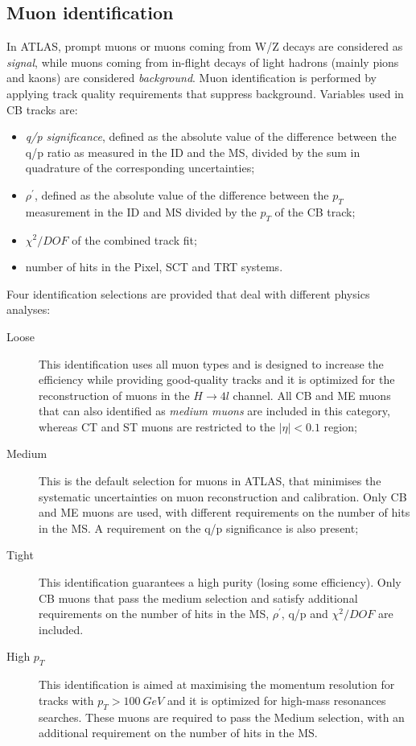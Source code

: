 \documentclass[a4paper,twoside,12pt]{book}
\begin{document}
\subsection*{Muon identification}
In ATLAS, prompt muons or muons coming from W/Z decays are considered as \textit{signal}, 
while muons coming from in-flight decays of light hadrons (mainly pions and kaons) 
are considered \textit{background}. 
Muon identification is performed by applying track quality requirements that
suppress background. Variables used in CB tracks are:
\begin{itemize}
\item \textit{q/p significance}, defined as the absolute value of the difference between the q/p
ratio as measured in the ID and the MS, divided by the sum in quadrature of the corresponding
uncertainties;
\item $\mathit{\rho^{'}}$, defined as the absolute value of the difference between the $p_{T}$
measurement in the ID and MS divided by the $p_{T}$ of the CB track;
\item $\chi^{2}/DOF$ of the combined track fit;
\item number of hits in the Pixel, SCT and TRT systems.
\end{itemize}

Four identification selections are provided that deal with different physics analyses:
\begin{description}
\item [Loose] This identification uses all muon types and is designed to increase the efficiency while providing
good-quality tracks and it is optimized for the reconstruction of muons in the $H \rightarrow 4l$ channel. All CB and ME muons that can also identified as \textit{medium muons} are included in this category, whereas CT and ST muons are restricted to the $|\eta| < 0.1$ region;
\item [Medium] This is the default selection for muons in ATLAS, that minimises
the systematic uncertainties on muon reconstruction and calibration. Only CB and ME
muons are used, with different requirements on the number of hits in the MS. A requirement
on the q/p significance is also present;
\item [Tight] This identification guarantees a high purity (losing some efficiency). Only
CB muons that pass the medium selection and satisfy additional requirements on the number
of hits in the MS, $\rho^{'}$, q/p and $\chi^{2}/DOF$ are included. 
\item [High \boldmath$p_{T}$] This identification is aimed at maximising the momentum resolution
for tracks with $p_{T} > 100\ GeV$ and it is optimized for high-mass resonances searches. 
These muons are required to pass the Medium selection, with an additional requirement on 
the number of hits in the MS. 
\end{description}
\end{document}
